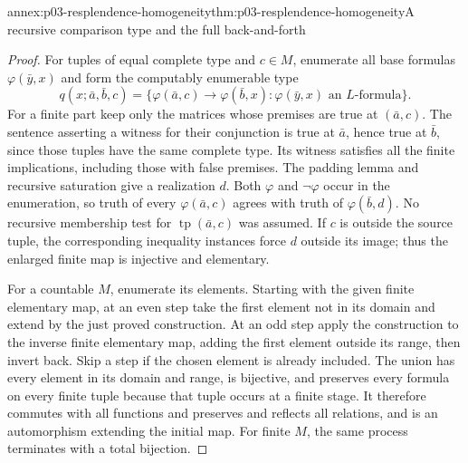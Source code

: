 \begin{annexitem}{annex:p03-resplendence-homogeneity}{thm:p03-resplendence-homogeneity}{A recursive comparison type and the full back-and-forth}
\begin{proof}
For tuples of equal complete type and \(c\in M\), enumerate all base
formulas \(\varphi(\bar y,x)\) and form the computably enumerable type
\[
 q(x;\bar a,\bar b,c)=
 \{\varphi(\bar a,c)\longrightarrow\varphi(\bar b,x):
                                      \varphi(\bar y,x)\text{ an }L\text{-formula}\}.
\]
For a finite part keep only the matrices whose premises are true at
\((\bar a,c)\). The sentence asserting a witness for their conjunction
is true at \(\bar a\), hence true at \(\bar b\), since those tuples
have the same complete type. Its witness satisfies all the finite
implications, including those with false premises. The padding lemma
and recursive saturation give a realization \(d\). Both \(\varphi\)
and \(\neg\varphi\) occur in the enumeration, so truth of every
\(\varphi(\bar a,c)\) agrees with truth of
\(\varphi(\bar b,d)\). No recursive membership test for
\(\operatorname{tp}(\bar a,c)\) was assumed. If \(c\) is outside the
source tuple, the corresponding inequality instances force \(d\)
outside its image; thus the enlarged finite map is injective and elementary.

For a countable \(M\), enumerate its elements. Starting with the given
finite elementary map, at an even step take the first element not in its
domain and extend by the just proved construction. At an odd step apply
the construction to the inverse finite elementary map, adding the first
element outside its range, then invert back. Skip a step if the chosen
element is already included. The union has every element in its domain
and range, is bijective, and preserves every formula on every finite
tuple because that tuple occurs at a finite stage. It therefore commutes
with all functions and preserves and reflects all relations, and is an
automorphism extending the initial map. For finite \(M\), the same
process terminates with a total bijection.
\end{proof}
\end{annexitem}

